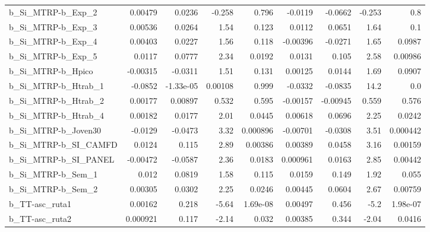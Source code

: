 \begin{tabular}{lrrrrrrrr}
b\_Si\_MTRP-b\_Exp\_2          &     0.00479 &       0.0236 &   -0.258 &    0.796 &    -0.0119 &     -0.0662 &       -0.253 &           0.8 \\
b\_Si\_MTRP-b\_Exp\_3          &     0.00536 &       0.0264 &     1.54 &    0.123 &     0.0112 &      0.0651 &         1.64 &           0.1 \\
b\_Si\_MTRP-b\_Exp\_4          &     0.00403 &       0.0227 &     1.56 &    0.118 &   -0.00396 &     -0.0271 &         1.65 &        0.0987 \\
b\_Si\_MTRP-b\_Exp\_5          &      0.0117 &       0.0777 &     2.34 &   0.0192 &     0.0131 &       0.105 &         2.58 &       0.00986 \\
b\_Si\_MTRP-b\_Hpico          &    -0.00315 &      -0.0311 &     1.51 &    0.131 &    0.00125 &      0.0144 &         1.69 &        0.0907 \\
b\_Si\_MTRP-b\_Htrab\_1        &     -0.0852 &    -1.33e-05 &  0.00108 &    0.999 &    -0.0332 &     -0.0835 &         14.2 &           0.0 \\
b\_Si\_MTRP-b\_Htrab\_2        &     0.00177 &      0.00897 &    0.532 &    0.595 &   -0.00157 &    -0.00945 &        0.559 &         0.576 \\
b\_Si\_MTRP-b\_Htrab\_4        &     0.00182 &       0.0177 &     2.01 &   0.0445 &    0.00618 &      0.0696 &         2.25 &        0.0242 \\
b\_Si\_MTRP-b\_Joven30        &     -0.0129 &      -0.0473 &     3.32 & 0.000896 &   -0.00701 &     -0.0308 &         3.51 &      0.000442 \\
b\_Si\_MTRP-b\_SI\_CAMFD       &      0.0124 &        0.115 &     2.89 &  0.00386 &    0.00389 &      0.0458 &         3.16 &       0.00159 \\
b\_Si\_MTRP-b\_SI\_PANEL       &    -0.00472 &      -0.0587 &     2.36 &   0.0183 &   0.000961 &      0.0163 &         2.85 &       0.00442 \\
b\_Si\_MTRP-b\_Sem\_1          &       0.012 &       0.0819 &     1.58 &    0.115 &     0.0159 &       0.149 &         1.92 &         0.055 \\
b\_Si\_MTRP-b\_Sem\_2          &     0.00305 &       0.0302 &     2.25 &   0.0246 &    0.00445 &      0.0604 &         2.67 &       0.00759 \\
b\_TT-asc\_ruta1             &     0.00162 &        0.218 &    -5.64 & 1.69e-08 &    0.00497 &       0.456 &         -5.2 &      1.98e-07 \\
b\_TT-asc\_ruta2             &    0.000921 &        0.117 &    -2.14 &    0.032 &    0.00385 &       0.344 &        -2.04 &        0.0416 \\

\end{tabular}
